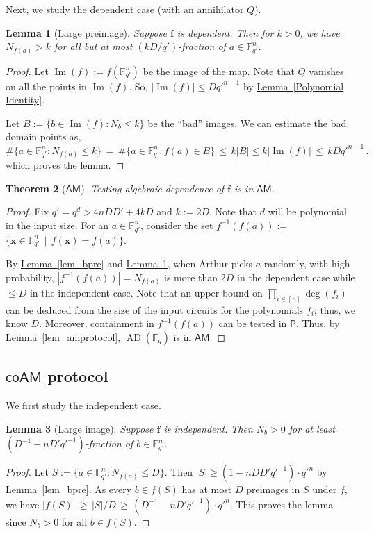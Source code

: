 \documentclass[11pt]{article}
\numberwithin{equation}{section}
\newtheorem{theorem}{Theorem}[section]
\newtheorem{lemma}[theorem]{Lemma}
\theoremstyle{definition}
\theoremstyle{plain}
\newcommand{\cclass}[1]{\textsf{#1}}
\newcommand{\expref}[2]{\hyperref[#2]{#1~\ref{#2}}}
\newcommand{\F}{\mathbb{F}}
\DeclareMathOperator{\im}{\mathrm{Im}}
\newcommand{\Pclass}{\cclass{P}\xspace}  %
\newcommand{\AM}{\cclass{AM}\xspace}  %
\newcommand{\coAM}{\cclass{coAM}\xspace}  %
\DeclareMathOperator{\AD}{\mathrm{AD}\xspace} %
\begin{document}
Next, we study the dependent case (with an annihilator $Q$).

\begin{lemma}[Large preimage]\label{lem_coamdep}
Suppose $\mathbf f$
%
is  %
dependent.
Then for $k>0$, we have $N_{f(a)}>k$ for all but at most $(kD/q')$-fraction of $a\in \F_{q'}^n$.
\end{lemma}
\begin{proof}
 Let $\im(f):= f(\F_{q'}^n)$ be the image of the map. Note that $Q$ vanishes on all the points in $\im(f)$. So, $|\im(f)| \leq Dq'^{n-1}$ by 
 \expref{Lemma}{Polynomial Identity}. %
 
Let $B:= \{b\in \im(f): N_b\leq k\}$ be the ``bad'' images. We can estimate the bad domain points as, 
\[
\#\{a\in \F_{q'}^n: N_{f(a)}\leq k\} \,=\, \#\{a\in \F_{q'}^n: f(a)\in B\} \,\le\,  k|B| \le k|\im(f)| \,\le\, k D q'^{n-1} \,.
\]
which proves the lemma.
\end{proof}


\begin{theorem}[$\AM$]\label{thm_am}
Testing algebraic dependence of $\mathbf f$ is in $\AM$.
\end{theorem}
\begin{proof}
Fix $q'=q^d>4nDD'+4kD$ and $k:=2D$. Note that $d$ will be polynomial in the input size.
For an $a\in \F_{q'}^n$, consider the set 
$f^{-1}(f(a)) :=$ $\{\mathbf x \in \F_{q'}^n \,\mid\, f(\mathbf x) = f(a) \}$.

%
By \expref{Lemma}{lem_bpre} and \expref{Lemma}{lem_coamdep}, when %
Arthur picks $a$ randomly, with high probability, $|f^{-1}(f(a))|= N_{f(a)}$ is more than $2D$ in the dependent case while $\le D$ in the independent case. Note that an upper bound on $\prod_{i\in [n]}\deg(f_i)$ can be deduced from the size of the input circuits for 
%
the polynomials $f_i$; %
thus, we know $D$. Moreover, containment in $f^{-1}(f(a))$ can be tested in 
%
$\Pclass$. %
Thus, by \expref{Lemma}{lem_amprotocol},
%
$\AD(\F_q)$    %
is in $\AM$.
\end{proof}


\subsection{\texorpdfstring{$\coAM$}{coAM} protocol}
We first study the independent case.
%

\begin{lemma}[Large image]\label{lem-coam-1}
Suppose $\mathbf f$
%
is  %
independent.
Then $N_b>0$ for at least $(D^{-1} - nD'q'^{-1})$-fraction of $b\in \F_{q'}^n$.
\end{lemma}
\begin{proof}
Let $S:= \{a\in \F_{q'}^n: N_{f(a)}\leq D\}$.
Then $|S|\geq (1-n DD'q'^{-1})\cdot q'^{n}$ by \expref{Lemma}{lem_bpre}.
As every $b\in f(S)$ has at most $D$ preimages in $S$ under $f$, we have 
$|f(S)| \,\ge\, |S|/D \,\ge\, (D^{-1}-nD'q'^{-1})\cdot q'^{n} $.
This proves the lemma since $N_b>0$ for all $b\in f(S)$.
\end{proof}
\end{document}
